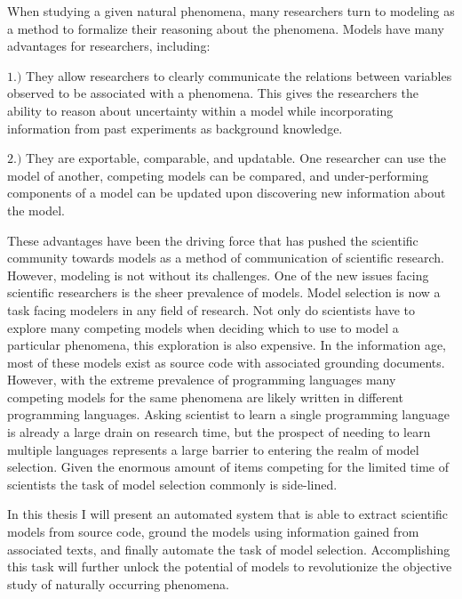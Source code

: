 
When studying a given natural phenomena, many researchers turn to modeling as a method to formalize their reasoning about the phenomena. Models have many advantages for researchers, including:

$1.)$ They allow researchers to clearly communicate the relations between variables observed to be associated with a phenomena. This gives the researchers the ability to reason about uncertainty within a model while incorporating information from past experiments as background knowledge.

$2.)$ They are exportable, comparable, and updatable. One researcher can use the model of another, competing models can be compared, and under-performing components of a model can be updated upon discovering new information about the model.

These advantages have been the driving force that has pushed the scientific community towards models as a method of communication of scientific research. However, modeling is not without its challenges. One of the new issues facing scientific researchers is the sheer prevalence of models. Model selection is now a task facing modelers in any field of research. Not only do scientists have to explore many competing models when deciding which to use to model a particular phenomena, this exploration is also expensive. In the information age, most of these models exist as source code with associated grounding documents. However, with the extreme prevalence of programming languages many competing models for the same phenomena are likely written in different programming languages. Asking scientist to learn a single programming language is already a large drain on research time, but the prospect of needing to learn multiple languages represents a large barrier to entering the realm of model selection. Given the enormous amount of items competing for the limited time of scientists the task of model selection commonly is side-lined.

In this thesis I will present an automated system that is able to extract scientific models from source code, ground the models using information gained from associated texts, and finally automate the task of model selection. Accomplishing this task will further unlock the potential of models to revolutionize the objective study of naturally occurring phenomena.
